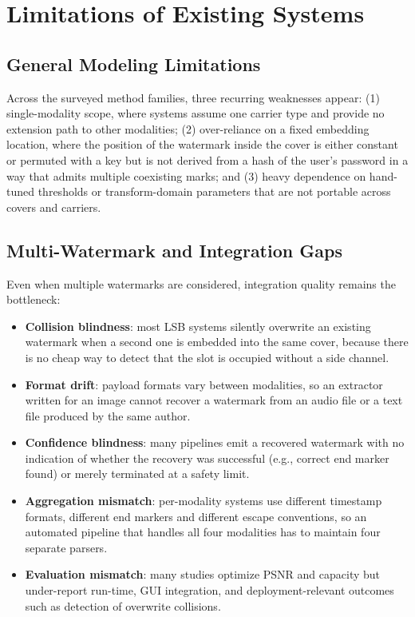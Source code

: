 \section{Limitations of Existing Systems}

\subsection{General Modeling Limitations}

Across the surveyed method families, three recurring weaknesses appear: (1) single-modality scope, where systems assume one carrier type and provide no extension path to other modalities; (2) over-reliance on a fixed embedding location, where the position of the watermark inside the cover is either constant or permuted with a key but is not derived from a hash of the user's password in a way that admits multiple coexisting marks; and (3) heavy dependence on hand-tuned thresholds or transform-domain parameters that are not portable across covers and carriers.

\subsection{Multi-Watermark and Integration Gaps}

Even when multiple watermarks are considered, integration quality remains the bottleneck:

\begin{itemize}
    \item \textbf{Collision blindness}: most LSB systems silently overwrite an existing watermark when a second one is embedded into the same cover, because there is no cheap way to detect that the slot is occupied without a side channel.
    \item \textbf{Format drift}: payload formats vary between modalities, so an extractor written for an image cannot recover a watermark from an audio file or a text file produced by the same author.
    \item \textbf{Confidence blindness}: many pipelines emit a recovered watermark with no indication of whether the recovery was successful (e.g., correct end marker found) or merely terminated at a safety limit.
    \item \textbf{Aggregation mismatch}: per-modality systems use different timestamp formats, different end markers and different escape conventions, so an automated pipeline that handles all four modalities has to maintain four separate parsers.
    \item \textbf{Evaluation mismatch}: many studies optimize PSNR and capacity but under-report run-time, GUI integration, and deployment-relevant outcomes such as detection of overwrite collisions.
\end{itemize}

